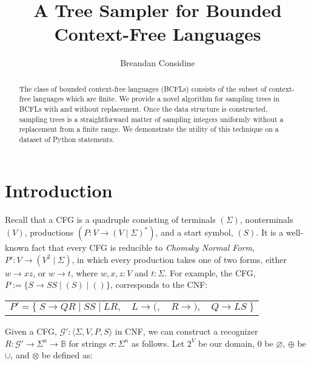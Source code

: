 \documentclass[sigplan,nonacm]{acmart}\settopmatter{printfolios=false,printccs=false,printacmref=false}
\begin{document}
  \title{A Tree Sampler for Bounded Context-Free Languages}
  \begin{abstract}
    The class of bounded context-free languages (BCFLs) consists of the subset of context-free languages which are finite. We provide a novel algorithm for sampling trees in BCFLs with and without replacement. Once the data structure is constructed, sampling trees is a straightforward matter of sampling integers uniformly without a replacement from a finite range. We demonstrate the utility of this technique on a dataset of Python statements.
  \end{abstract}

  \author{Breandan Considine}

  \maketitle

  \section{Introduction}

  Recall that a CFG is a quadruple consisting of terminals $(\Sigma)$, nonterminals $(V)$, productions $(P\colon V \rightarrow (V \mid \Sigma)^*)$, and a start symbol, $(S)$. It is a well-known fact that every CFG is reducible to \textit{Chomsky Normal Form}, $P'\colon V \rightarrow (V^2 \mid \Sigma)$, in which every production takes one of two forms, either $w \rightarrow xz$, or $w \rightarrow t$, where $w, x, z: V$ and $t: \Sigma$. For example, the CFG, $P:=\{S \rightarrow S S \mid ( S ) \mid ()\}$, corresponds to the CNF:\vspace{-3pt}

  \begin{table}[H]
    \begin{tabular}{llll}
      $P'=\big\{\;S\rightarrow QR \mid SS \mid LR,$ & $L \rightarrow (,$ & $R \rightarrow ),$ & $Q\rightarrow LS\;\big\}$
    \end{tabular}
  \end{table}\vspace{-8pt}

  \noindent Given a CFG, $\mathcal{G}' : \langle \Sigma, V, P, S\rangle$ in CNF, we can construct a recognizer $R: \mathcal{G}' \rightarrow \Sigma^n \rightarrow \mathbb{B}$ for strings $\sigma: \Sigma^n$ as follows. Let $2^V$ be our domain, $0$ be $\varnothing$, $\oplus$ be $\cup$, and $\otimes$ be defined as:\vspace{-10pt}
\end{document}
